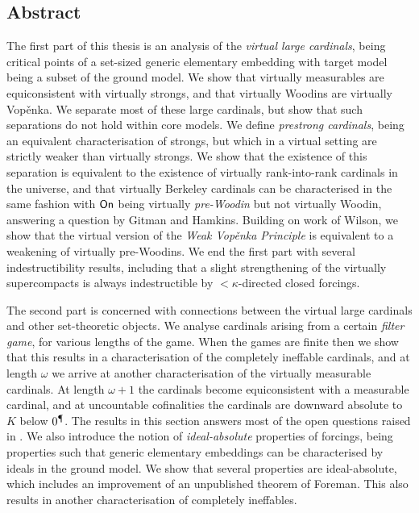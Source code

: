 \documentclass[../main]{subfiles}
\begin{document}
\thispagestyle{fancy}
\setlength{\parindent}{18pt}

\begin{onehalfspacing}

    \vspace*{75pt}

    \section*{\huge Abstract}

    The first part of this thesis is an analysis of the \textit{virtual large cardinals}, being critical points of a set-sized generic elementary embedding with target model being a subset of the ground model. We show that virtually measurables are equiconsistent with virtually strongs, and that virtually Woodins are virtually Vop\v enka. We separate most of these large cardinals, but show that such separations do not hold within core models. We define \textit{prestrong cardinals}, being an equivalent characterisation of strongs, but which in a virtual setting are strictly weaker than virtually strongs. We show that the existence of this separation is equivalent to the existence of virtually rank-into-rank cardinals in the universe, and that virtually Berkeley cardinals can be characterised in the same fashion with $\textsf{On}$ being virtually \textit{pre-Woodin} but not virtually Woodin, answering a question by Gitman and Hamkins. Building on work of Wilson, we show that the virtual version of the \textit{Weak Vop\v enka Principle} is equivalent to a weakening of virtually pre-Woodins. We end the first part with several indestructibility results, including that a slight strengthening of the virtually supercompacts is always indestructible by ${<}\kappa$-directed closed forcings.

    The second part is concerned with connections between the virtual large cardinals and other set-theoretic objects. We analyse cardinals arising from a certain \textit{filter game}, for various lengths of the game. When the games are finite then we show that this results in a characterisation of the completely ineffable cardinals, and at length $\omega$ we arrive at another characterisation of the virtually measurable cardinals. At length $\omega+1$ the cardinals become equiconsistent with a measurable cardinal, and at uncountable cofinalities the cardinals are downward absolute to $K$ below $0^\mathparagraph$. The results in this section answers most of the open questions raised in \cite{HolySchlicht}. We also introduce the notion of \textit{ideal-absolute} properties of forcings, being properties such that generic elementary embeddings can be characterised by ideals in the ground model. We show that several properties are ideal-absolute, which includes an improvement of an unpublished theorem of Foreman. This also results in another characterisation of completely ineffables.

\end{onehalfspacing}
\end{document}
